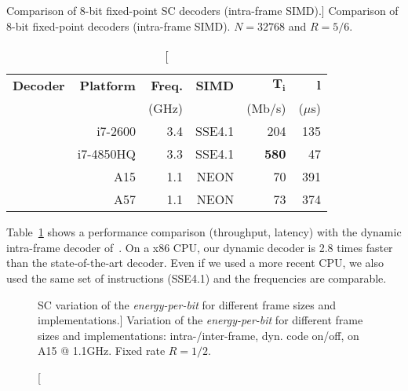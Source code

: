 \begin{table}[htp]
  \centering
  \caption
    [Comparison of 8-bit fixed-point SC decoders (intra-frame SIMD).]
    {Comparison of 8-bit fixed-point decoders (intra-frame SIMD). $N = 32768$
    and $R = 5/6$.}
  \label{tab:eval_polar_energy_comparison}
  \begin{tabular}{r r r r r r}
    \textbf{Decoder} & \textbf{Platform} & \textbf{Freq.} & \textbf{SIMD} & $\bm{T_i}$ & $\bm{l}$ \\
                     &                   &          (GHz) &               &     (Mb/s) & ($\mu$s) \\
    \hline
    \hline
    \cite{Giard2014}     & i7-2600   & 3.4 & SSE4.1 &         204  &  135 \\ %
    \cite{Cassagne2016b} & i7-4850HQ & 3.3 & SSE4.1 & \textbf{580} &   47 \\ %
    \cite{Cassagne2016b} & A15       & 1.1 & NEON   &          70  &  391 \\ %
    \cite{Cassagne2016b} & A57       & 1.1 & NEON   &          73  &  374 \\
  \end{tabular}
\end{table}

Table~\ref{tab:eval_polar_energy_comparison} shows a performance comparison
(throughput, latency) with the dynamic intra-frame decoder of~\cite{Giard2014}.
On a x86 CPU, our dynamic decoder is 2.8 times faster than the state-of-the-art
decoder. Even if we used a more recent CPU, we also used the same set of
instructions (SSE4.1) and the frequencies are comparable.

\begin{figure}[htp]
  \centering
  \quad
  \caption
    [SC variation of the \emph{energy-per-bit} for different frame sizes and
    implementations.]
    {Variation of the \emph{energy-per-bit} for different frame sizes and
    implementations: intra-/inter-frame, dyn. code on/off, on A15 @ 1.1GHz.
    Fixed rate $R = 1/2$.}
  \label{plot:eval_polar_sc_energy_implems_vs}
\end{figure}

